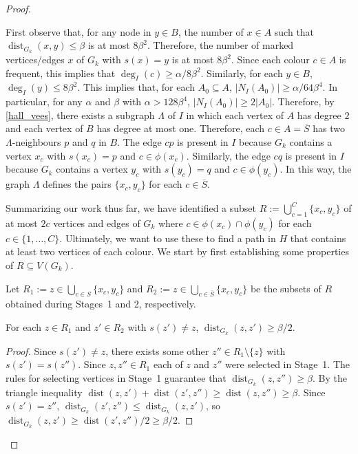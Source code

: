 \documentclass{patmorin}
\DeclareMathOperator{\dist}{dist}
\begin{document}
\begin{proof}
\begin{compactenum}[{Stage} 1:]
    First observe that, for any node in $y\in B$, the number of $x\in A$ such that $\dist_{G_k}(x,y) \le \beta$ is at most $8\beta^2$.   Therefore, the number of marked vertices/edges $x$ of $G_k$ with $s(x)=y$ is at most $8\beta^2$.  Since each colour $c\in A$ is frequent, this implies that $\deg_I(c)\ge \alpha/8\beta^2$.  Similarly, for each $y\in B$,  $\deg_{I}(y) \le 8\beta^2$.  This implies that, for each $A_0\subseteq A$, $|N_I(A_0)|\ge \alpha/64\beta^4$.   In particular, for any $\alpha$ and $\beta$ with $\alpha > 128\beta^4$,  $|N_I(A_0)|\ge 2|A_0|$.  Therefore, by \cref{hall_vees}, there exists a subgraph $\Lambda$ of $I$ in which each vertex of $A$ has degree $2$ and each vertex of $B$ has degree at most one.  Therefore, each $c\in A=\overline{S}$ has two $\Lambda$-neighbours $p$ and $q$ in $B$.  The edge $cp$ is present in $I$ because $G_k$ contains a vertex $x_c$ with $s(x_c)=p$ and $c\in \phi(x_c)$.  Similarly, the edge $cq$ is present in $I$ because $G_k$ contains a vertex $y_c$ with $s(y_c)=q$ and $c\in\phi(y_c)$.  In this way, the graph $\Lambda$ defines the pairs $\{x_c,y_c\}$ for each $c\in\overline{S}$.
  \end{compactenum}

  Summarizing our work thus far, we have identified a subset  $R:=\bigcup_{c=1}^C\{x_c,y_c\}$ of at most $2c$ vertices and edges of $G_k$ where $c\in \phi(x_c)\cap \phi(y_c)$ for each $c\in\{1,\ldots,C\}$. Ultimately, we want to use these to find a path in $H$ that contains at least two vertices of each colour.  We start by first establishing some properties of $R\subseteq V(G_k)$.

  Let $R_1:=z\in\bigcup_{c\in S}\{x_c,y_c\}$ and $R_2:=z\in\bigcup_{c\in \overline{S}}\{x_c,y_c\}$ be the subsets of $R$ obtained during Stages~1 and 2, respectively.

  \begin{clm}\label{far_from_home}
    For each $z\in R_1$ and $z'\in R_2$ with $s(z')\neq z$, $\dist_{G_k}(z,z')\ge \beta /2$.
  \end{clm}

  \begin{proof}
    Since $s(z')\neq z$, there exists some other $z''\in R_1\setminus\{z\}$ with $s(z')=s(z'')$.  Since $z,z''\in R_1$ each of $z$ and $z''$ were selected in Stage~1.  The rules for selecting vertices in Stage~1 guarantee that $\dist_{G_k}(z,z'')\ge \beta$.  By the triangle inequality $\dist(z, z')+\dist(z',z'') \ge \dist(z,z'')\ge \beta$.  Since $s(z')=z''$, $\dist_{G_k}(z', z'') \le \dist_{G_k}(z, z')$, so $\dist_{G_k}(z,z') \ge \dist(z',z'')/2 \ge \beta/2$.
  \end{proof}


\end{proof}
\end{document}
